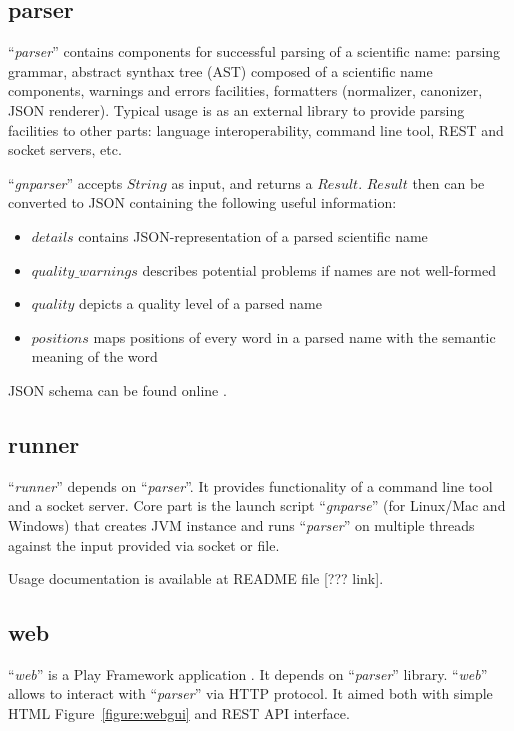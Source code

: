 \documentclass{bmcart}
\begin{document}
\subsection*{parser}

``\textit{parser}'' contains components for successful parsing of a scientific
name: parsing grammar, abstract synthax tree (AST) composed of a scientific
name components, warnings and errors facilities, formatters (normalizer,
canonizer, JSON \cite{bray2014javascript} renderer). Typical usage is as an
external library to provide parsing facilities to other parts: language
interoperability, command line tool, REST and socket servers, etc.

``\textit{gnparser}'' accepts $String$ as input, and returns a $Result$.
$Result$ then can be converted to JSON containing the following useful
information:

\begin{itemize}
  \item $details$ contains JSON-representation of a parsed scientific name
  \item $quality\_warnings$ describes potential problems if names are not
    well-formed
  \item $quality$ depicts a quality level of a parsed name
  \item $positions$ maps positions of every word in a parsed name with
    the semantic meaning of the word
\end{itemize}

JSON schema can be found online \cite{gnparser_json}.

\subsection*{runner}

``\textit{runner}'' depends on ``\textit{parser}''. It provides functionality
of a command line tool and a socket server. Core part is the launch script
``\textit{gnparse}'' (for Linux/Mac and Windows) that creates JVM
instance and runs ``\textit{parser}'' on multiple threads against the input
provided via socket or file.

Usage documentation is available at README file [??? link].

\subsection*{web}

``\textit{web}'' is a Play Framework application \cite{wampler2011scala}. It
depends on ``\textit{parser}'' library. ``\textit{web}'' allows to interact
with ``\textit{parser}'' via HTTP protocol. It aimed both with simple HTML
Figure~\ref{figure:webgui} and REST API interface.
\end{document}
